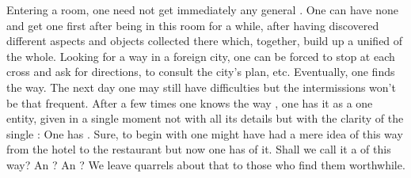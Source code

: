 Entering a room, one need not get immediately any general . One
can have none and get one first after being in this room for a while, after
having discovered different aspects and objects collected there which, together,
build up a unified  of the whole.  Looking for a way in a foreign
city, one can be forced to stop at each cross and ask for directions, to consult
the city's plan, etc. Eventually, one finds the way.  The next day one may still
have difficulties but the intermissions won't be that frequent. After a few
times one knows the way , one has it as a one entity, given in a
single moment not with all its details but with the clarity of the single
:  One has . Sure, to begin
with one might have had a mere idea of this way from the hotel to the restaurant
but now one has  of it. Shall we call it a  of
this way? An ? An ?  We leave quarrels about
that to those who find them worthwhile.

